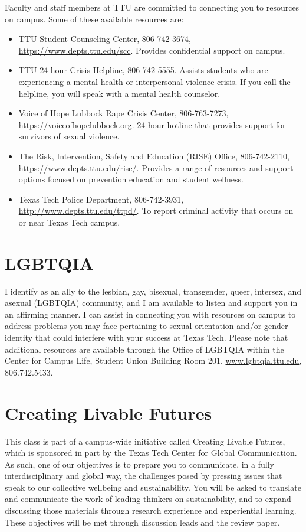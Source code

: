 \documentclass[12pt, notitlepage]{article}   	%
\begin{document}
{Faculty and staff members at TTU are committed to connecting you to resources on campus. 
Some of these available resources are: 
\begin{itemize}
	\item{TTU Student Counseling Center, 806-742-3674, \url{https://www.depts.ttu.edu/scc}. 
		Provides confidential support on campus.} 
	\item{TTU 24-hour Crisis Helpline, 806-742-5555. 
		Assists students who are experiencing a mental health or interpersonal violence 
		crisis. If you call the helpline, you will speak with a mental health counselor.} 
	\item{Voice of Hope Lubbock Rape Crisis Center, 806-763-7273, 
		\url{https://voiceofhopelubbock.org}.
		24-hour hotline that provides support for survivors of sexual violence.} 
	\item{The Risk, Intervention, Safety and Education (RISE) Office, 806-742-2110, 
		\url{https://www.depts.ttu.edu/rise/}. Provides a range of resources and support 
		options focused on prevention education and student wellness.} 
	\item{Texas Tech Police Department, 806-742-3931, 
		\url{http://www.depts.ttu.edu/ttpd/}. 
		To report criminal activity that occurs on or near Texas Tech campus.}
\end{itemize}

\section{LGBTQIA}
I identify as an ally to the lesbian, gay, bisexual, transgender, queer, intersex, 
and asexual (LGBTQIA) community, and I am available to listen and support you in an 
affirming manner. I can assist in connecting you with resources on campus to address 
problems you may face pertaining to sexual orientation and/or gender identity that could 
interfere with your success at Texas Tech. Please note that additional resources are 
available through the Office of LGBTQIA within the Center for Campus Life, 
Student Union Building Room 201, 
\url{www.lgbtqia.ttu.edu}, 806.742.5433.

\section{Creating Livable Futures}
This class is part of a campus-wide initiative called Creating Livable Futures, 
which is sponsored in part by the Texas Tech Center for Global Communication. 
As such, one of our objectives is to prepare you to communicate, 
in a fully interdisciplinary and global way, the challenges posed by pressing issues 
that speak to our collective wellbeing and sustainability. You will be asked to translate 
and communicate the work of leading thinkers on sustainability, and to expand discussing 
those materials through research experience and experiential learning.
These objectives will be met through discussion leads and the review paper. 

}
\end{document}
